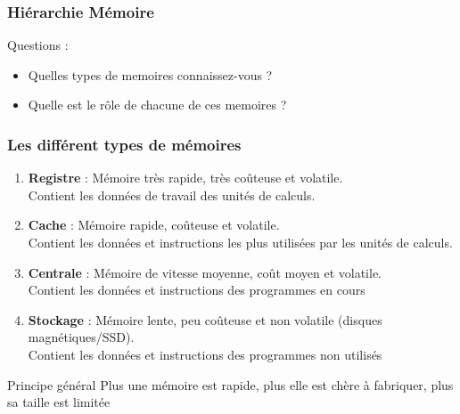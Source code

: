 \documentclass[8pt]{beamer}
\begin{document}
\begin{frame}
    \frametitle{Hiérarchie Mémoire}

    Questions :
    \begin{itemize}
        \item Quelles types de memoires connaissez-vous ?
        \item Quelle est le r\^ole de chacune de ces memoires ?
    \end{itemize}
\end{frame}

\begin{frame}
    \frametitle{Les différent types de mémoires}
    \begin{enumerate}
        \item \textbf{Registre} : Mémoire très rapide, très coûteuse et
              volatile. \\
              Contient les données de travail des unités de calculs.
        \item \textbf{Cache} : Mémoire rapide, coûteuse et volatile. \\
              Contient les données et instructions les plus utilisées par les
              unités de calculs.
        \item \textbf{Centrale} : Mémoire de vitesse moyenne, coût moyen et
              volatile. \\
              Contient les données et instructions des programmes en cours
        \item \textbf{Stockage} : Mémoire lente, peu coûteuse et non volatile
              (disques
              magnétiques/SSD). \\
              Contient les données et instructions des programmes non utilisés
    \end{enumerate}
    \begin{block}{Principe général}
        Plus une m\'emoire est rapide, plus elle est ch\`ere \`a
        fabriquer, plus sa taille est limit\'ee
    \end{block}

\end{frame}
\end{document}
